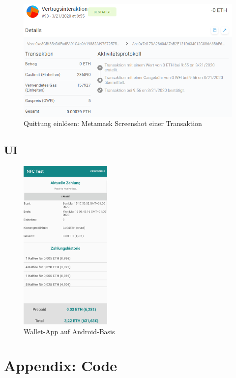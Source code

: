 \begin{figure}[h]
 \centering
 \includegraphics[width=1.0\textwidth]{gfx/screenshots/redeem.PNG}
 \caption{Quittung einlösen: Metamask Screenshot einer Transaktion}
 \label{fig:appendix:costs:reddeem}
\end{figure}


\clearpage

\section{UI}
\label{sec:appendix:implementation:ui}
\begin{figure}[h]
 \centering
 \includegraphics[width=0.4\textwidth]{gfx/screenshots/smartphone.jpg}
 \caption{Wallet-App auf Android-Basis}
 \label{fig:appendix:ui:smartphone}
\end{figure}
\newpage

\chapter{Appendix: Code}
\label{ch:appendix:code}




